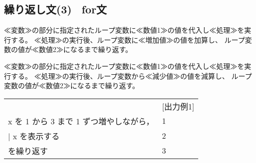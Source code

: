 \documentclass[11pt,a4j]{jarticle}
\begin{document}
\vspace{-8mm}
\subsection{繰り返し文(3) \ for文}
\begin{quotation}
\end{quotation}

≪変数≫の部分に指定されたループ変数に≪数値1≫の値を代入し≪処理≫を実行する。
≪処理≫の実行後、ループ変数に≪増加値≫の値を加算し、
ループ変数の値が≪数値2≫になるまで繰り返す。

\begin{quotation}
\end{quotation}

≪変数≫の部分に指定されたループ変数に≪数値1≫の値を代入し≪処理≫を実行する。
≪処理≫の実行後、ループ変数から≪減少値≫の値を減算し、
ループ変数の値が≪数値2≫になるまで繰り返す。

\vspace{3mm}
\hspace*{10mm}
\begin{tabular}{l l}
\noindent [使用例1] & \hspace{1cm} [出力例1] \\
\hspace{1cm} \noindent x を 1 から 3 まで 1 ずつ増やしながら，&
\hspace{2cm} 1 \\
\hspace{1cm}   \hspace{1zw} $|$ \hspace{1zw}  x を表示する & 
\hspace{2cm} 2 \\
\hspace{1cm} を繰り返す &
\hspace{2cm} 3 \\
\end{tabular}
\end{document}
